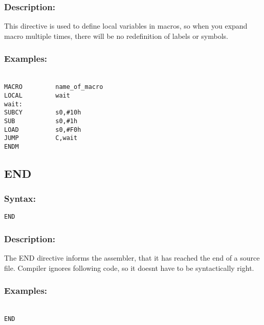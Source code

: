         \subsubsection{Description:}
            This directive is used to define local variables in macros, so when you expand macro multiple times, there will be no redefinition of labels or symbols.

        \subsubsection{Examples:}
            {
            ~\\
            \usecodefont
                \verb'MACRO         name_of_macro'\\
                \verb'LOCAL         wait'\\
                \verb'wait:'\\
                \verb'SUBCY         s0,#10h'\\
                \verb'SUB           s0,#1h' \\
                \verb'LOAD          s0,#F0h'\\
                \verb'JUMP          C,wait'\\
                \verb'ENDM'\\
            }

    \subsection{END}
        \subsubsection{Syntax:}
            \verb'END'

        \subsubsection{Description:}
        The END directive informs the assembler, that it has reached the end of a source file. Compiler ignores following code, so it doesnt have to be
        syntactically right.

        \subsubsection{Examples:}
            {
                ~\\
                \usecodefont
                \verb'END'
            }

